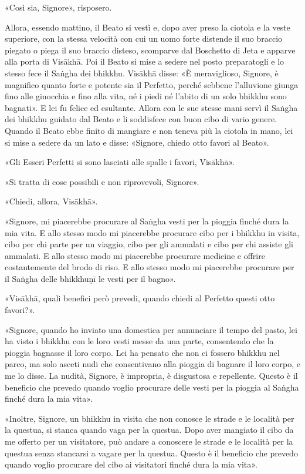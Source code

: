«Così sia, Signore», risposero.

Allora, essendo mattino, il Beato si vestì e, dopo aver preso la ciotola e la
veste superiore, con la stessa velocità con cui un uomo forte distende il suo
braccio piegato o piega il suo braccio disteso, scomparve dal Boschetto di Jeta
e apparve alla porta di Visākhā. Poi il Beato si mise a sedere nel posto
preparatogli e lo stesso fece il Saṅgha dei bhikkhu. Visākhā disse: «È
meraviglioso, Signore, è magnifico quanto forte e potente sia il Perfetto,
perché sebbene l’alluvione giunga fino alle ginocchia e fino alla vita, né i
piedi né l’abito di un solo bhikkhu sono bagnati». E lei fu felice ed esultante.
Allora con le sue stesse mani servì il Saṅgha dei bhikkhu guidato dal Beato e li
soddisfece con buon cibo di vario genere. Quando il Beato ebbe finito di
mangiare e non teneva più la ciotola in mano, lei si mise a sedere da un lato e
disse: «Signore, chiedo otto favori al Beato».

«Gli Esseri Perfetti si sono lasciati alle spalle i favori, Visākhā».

«Si tratta di cose possibili e non riprovevoli, Signore».

«Chiedi, allora, Visākhā».

«Signore, mi piacerebbe procurare al Saṅgha vesti per la pioggia finché dura la
mia vita. E allo stesso modo mi piacerebbe procurare cibo per i bhikkhu in
visita, cibo per chi parte per un viaggio, cibo per gli ammalati e cibo per chi
assiste gli ammalati. E allo stesso modo mi piacerebbe procurare medicine e
offrire costantemente del brodo di riso. E allo stesso modo mi piacerebbe
procurare per il Saṅgha delle bhikkhuṇī le vesti per il bagno».

«Visākhā, quali benefici però prevedi, quando chiedi al Perfetto questi otto
favori?».

«Signore, quando ho inviato una domestica per annunciare il tempo del pasto, lei
ha visto i bhikkhu con le loro vesti messe da una parte, consentendo che la
pioggia bagnasse il loro corpo. Lei ha pensato che non ci fossero bhikkhu nel
parco, ma solo asceti nudi che consentivano alla pioggia di bagnare il loro
corpo, e me lo disse. La nudità, Signore, è impropria, è disgustosa e
repellente. Questo è il beneficio che prevedo quando voglio procurare delle
vesti per la pioggia al Saṅgha finché dura la mia vita».

«Inoltre, Signore, un bhikkhu in visita che non conosce le strade e le località
per la questua, si stanca quando vaga per la questua. Dopo aver mangiato il cibo
da me offerto per un visitatore, può andare a conoscere le strade e le località
per la questua senza stancarsi a vagare per la questua. Questo è il beneficio
che prevedo quando voglio procurare del cibo ai visitatori finché dura la mia
vita».

